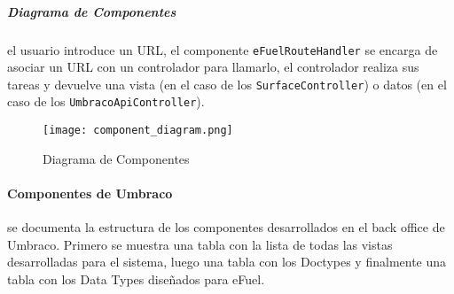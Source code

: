 \subparagraph*{Diagrama de Componentes} el usuario introduce un URL, el componente \texttt{eFuel\-RouteHandler} se encarga de asociar un URL con un controlador para llamarlo, el controlador realiza sus tareas y devuelve una vista (en el caso de los \texttt{SurfaceController}) o datos (en el caso de los \texttt{UmbracoApiController}).

\begin{figure}[H]
    \texttt{[image: component\_diagram.png]}
    \caption{Diagrama de Componentes}
    \label{fig:component_diagram}
    \centering
\end{figure}

\paragraph{Componentes de Umbraco} se documenta la estructura de los componentes desarrollados en el back office de Umbraco. Primero se muestra una tabla con la lista de todas las vistas desarrolladas para el sistema, luego una tabla con los Doctypes y finalmente una tabla con los Data Types diseñados para eFuel.

